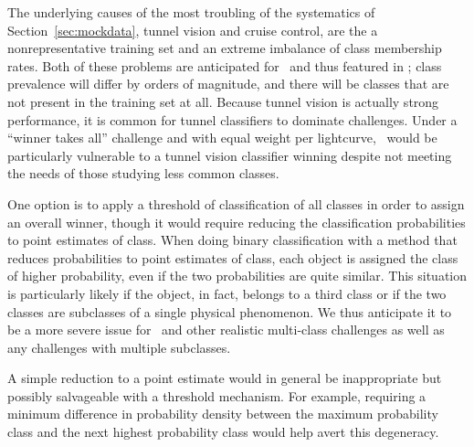 
The underlying causes of the most troubling of the systematics of Section~\ref{sec:mockdata}, tunnel vision and cruise control, are the a nonrepresentative training set and an extreme imbalance of class membership rates.
Both of these problems are anticipated for \lsst\ and thus featured in \plasticc; class prevalence will differ by orders of magnitude, and there will be classes that are not present in the training set at all.
Because tunnel vision is actually strong performance, it is common for tunnel classifiers to dominate challenges.
Under a ``winner takes all'' challenge and with equal weight per lightcurve, \plasticc\ would be particularly vulnerable to a tunnel vision classifier winning despite not meeting the needs of those studying less common classes.

One option is to apply a threshold of classification of all classes in order to assign an overall winner, though it would require reducing the classification probabilities to point estimates of class.
When doing binary classification with a method that reduces probabilities to point estimates of class, each object is assigned the class of higher probability, even if the two probabilities are quite similar.
This situation is particularly likely if the object, in fact, belongs to a third class or if the two classes are subclasses of a single physical phenomenon.
We thus anticipate it to be a more severe issue for \plasticc\ and other realistic multi-class challenges as well as any challenges with multiple subclasses.

A simple reduction to a point estimate would in general be inappropriate but possibly salvageable with a threshold mechanism.
For example, requiring a minimum difference in probability density between the maximum probability class and the next highest probability class would help avert this degeneracy.

